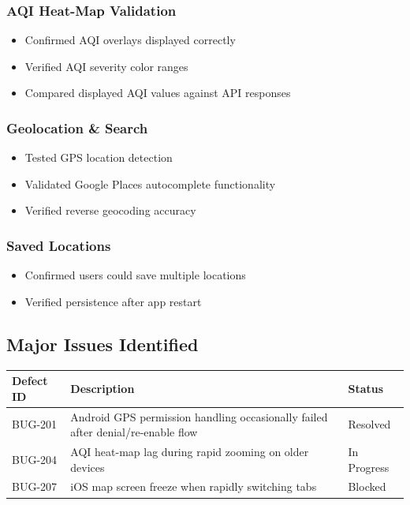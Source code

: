 \subsubsection{AQI Heat-Map Validation}
\begin{itemize}
    \item Confirmed AQI overlays displayed correctly
    \item Verified AQI severity color ranges
    \item Compared displayed AQI values against API responses
\end{itemize}

\subsubsection{Geolocation \& Search}
\begin{itemize}
    \item Tested GPS location detection
    \item Validated Google Places autocomplete functionality
    \item Verified reverse geocoding accuracy
\end{itemize}

\subsubsection{Saved Locations}
\begin{itemize}
    \item Confirmed users could save multiple locations
    \item Verified persistence after app restart
\end{itemize}

\subsection{Major Issues Identified}

\begin{table}[h]
\centering
\begin{tabular}{|l|p{9cm}|l|}
\hline
\textbf{Defect ID} & \textbf{Description} & \textbf{Status} \\
\hline
BUG-201 & Android GPS permission handling occasionally failed after denial/re-enable flow & Resolved \\
\hline
BUG-204 & AQI heat-map lag during rapid zooming on older devices & In Progress \\
\hline
BUG-207 & iOS map screen freeze when rapidly switching tabs & Blocked \\
\hline
\end{tabular}
\end{table}

